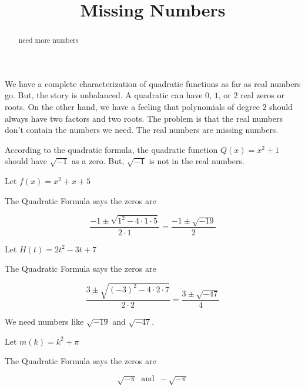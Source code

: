 \documentclass{ximera}
\title{Missing Numbers}
\begin{document}
\begin{abstract}
need more numbers
\end{abstract}
\maketitle




We have a complete characterization of quadratic functions as far as real numbers go.  But, the story is unbalanced.  A quadratic can have $0$, $1$, or $2$ real zeros or roots.  On the other hand, we have a feeling that polynomials of degree $2$ should always have two factors and two roots.  The problem is that the real numbers don't contain the numbers we need.  The real numbers are missing numbers.


According to the quadratic formula, the quadratic function $Q(x) = x^2 + 1$ should have $\sqrt{-1}$ as a zero.  But, $\sqrt{-1}$ is not in the real numbers. 




\begin{example}  
   
  
Let $f(x) = x^2 + x + 5$


The Quadratic Formula says the zeros are 


\[
\frac{-1 \pm \sqrt{1^2 - 4 \cdot 1 \cdot 5}}{2 \cdot 1} = \frac{-1 \pm \sqrt{-19}}{2}
\]


\end{example}






\begin{example}  
   
  
Let $H(t) = 2t^2 - 3t + 7$


The Quadratic Formula says the zeros are 


\[
\frac{3 \pm \sqrt{(-3)^2 - 4 \cdot 2 \cdot 7}}{2 \cdot 2} = \frac{3 \pm \sqrt{-47}}{4}
\]


\end{example}



We need numbers like $\sqrt{-19}$ and $\sqrt{-47}$. \\









\begin{example}  
   
  
Let $m(k) = k^2 + \pi $


The Quadratic Formula says the zeros are 


\[
\sqrt{-\pi} \, \text{ and } \, -\sqrt{-\pi}
\]


\end{example}
\end{document}
